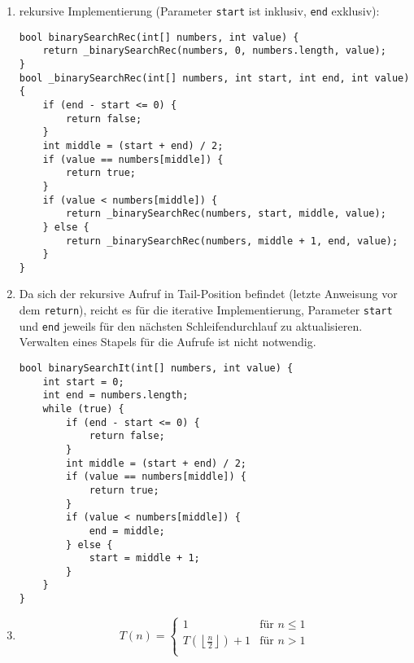 \documentclass[11pt,a4paper]{article}
\begin{document}
\begin{loesung}
\begin{enumerate}
    \item rekursive Implementierung (Parameter \texttt{start} ist inklusiv, \texttt{end} exklusiv):
    \begin{lstlisting}
bool binarySearchRec(int[] numbers, int value) {
    return _binarySearchRec(numbers, 0, numbers.length, value);
}
bool _binarySearchRec(int[] numbers, int start, int end, int value) {
    if (end - start <= 0) {
        return false;
    }
    int middle = (start + end) / 2;
    if (value == numbers[middle]) {
        return true;
    }
    if (value < numbers[middle]) {
        return _binarySearchRec(numbers, start, middle, value);
    } else {
        return _binarySearchRec(numbers, middle + 1, end, value);
    }
}
    \end{lstlisting}
    \item Da sich der rekursive Aufruf in Tail-Position befindet (letzte Anweisung vor dem \texttt{return}), reicht es für die iterative Implementierung, Parameter \texttt{start} und \texttt{end} jeweils für den nächsten Schleifendurchlauf zu aktualisieren.
    Verwalten eines Stapels für die Aufrufe ist nicht notwendig.
    \begin{lstlisting}
bool binarySearchIt(int[] numbers, int value) {
    int start = 0;
    int end = numbers.length;
    while (true) {
        if (end - start <= 0) {
            return false;
        }
        int middle = (start + end) / 2;
        if (value == numbers[middle]) {
            return true;
        }
        if (value < numbers[middle]) {
            end = middle;
        } else {
            start = middle + 1;
        }
    }
}
    \end{lstlisting}
    \item 
    \begin{equation}
        T(n) = \begin{cases}
            1 & \text{für $n \leq 1$} \\
            T(\left\lfloor \frac{n}{2} \right\rfloor) + 1  & \text{für $n > 1$} \\
        \end{cases}
    \end{equation}
\end{enumerate}

\end{loesung}
\end{document}
